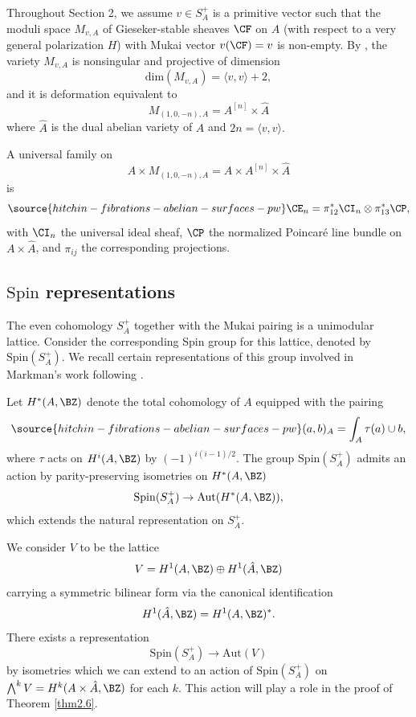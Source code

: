 Throughout Section 2, we assume $v \in S_A^+$ is a primitive vector such that the moduli space $M_{v,A}$ of Gieseker-stable sheaves $\CF$ on $A$ (with respect to a very general polarization $H$) with Mukai vector $v(\CF) = v$ is non-empty. By \cite[Theorem 0.1]{Yo}, the variety $M_{v,A}$ is nonsingular and projective of dimension
\[
\mathrm{dim} (M_{v,A}) = \langle v,v\rangle +2,
\]
and it is deformation equivalent to
\[
M_{(1,0,-n), A} = A^{[n]} \times \hat{A}
\]
where $\hat{A}$ is the dual abelian variety of $A$ and {$2n = \langle v ,v \rangle$.}

A universal family on
\[
A \times M_{(1,0,-n), A} = A \times A^{[n]} \times  \hat{A}
\]
is
\begin{equation}\label{univ_ideal}
\source{hitchin-fibrations-abelian-surfaces-pw}
\CE_n = \pi_{12}^\ast \CI_n \otimes \pi_{13}^\ast \CP,
\end{equation}
with $\CI_n$ the universal ideal sheaf, $\CP$ the normalized Poincar\'e line bundle on $A \times \hat{A}$, and $\pi_{ij}$ the corresponding projections.

\subsection{$\mathrm{Spin}$ representations}\label{spin8reps}

The even cohomology $S_A^+$ together with the Mukai pairing is a unimodular lattice.
Consider the corresponding Spin group for this lattice, denoted by $\mathrm{Spin}(S_A^+)$. We recall certain representations of this group involved in Markman's work following \cite[Section 3]{Markman3}.

Let $H^*(A,\BZ)$ denote the total cohomology of $A$ equipped with the pairing
\begin{equation}\label{pairing}
\source{hitchin-fibrations-abelian-surfaces-pw}
(a,b)_A = \int_{A}\tau(a)\cup b,
\end{equation}
where $\tau$ acts on $H^i(A,\BZ)$ by $(-1)^{i(i-1)/2}$.
The group $\mathrm{Spin}(S_A^+)$ admits an action by  parity-preserving  isometries on $H^*(A, \BZ)$
\[\mathrm{Spin}(S_A^+) \rightarrow \mathrm{Aut}(H^*(A, \BZ)),\]
which extends the natural representation on $S_A^+$.

We consider $V$ to be the lattice
\[
V = H^1(A, \BZ) \oplus H^1(\hat{A} ,\BZ)
\]
carrying a symmetric bilinear form via the canonical identification \[
H^1(\hat{A}, \BZ) = H^1(A, \BZ)^*.
\]
There exists a representation
\[\mathrm{Spin}(S_A^+) \rightarrow \mathrm{Aut}(V)\]
by isometries which we can extend to an action of $\mathrm{Spin}(S_A^+)$
on $\bigwedge^{k}V = H^{k}(A \times \hat{A},\BZ)$ for each $k$. This action will play a role in the proof
of Theorem \ref{thm2.6}.

